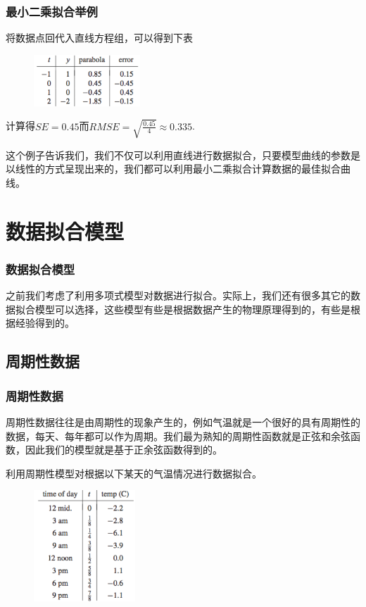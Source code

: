 \documentclass[10pt]{beamer}
\begin{document}
\begin{frame}
\frametitle{最小二乘拟合举例}
将数据点回代入直线方程组，可以得到下表
\begin{figure}
\includegraphics[width=4cm]{figs/4-1-2_Fitting_Data-5} 
\end{figure}
计算得$SE = 0.45$而$RMSE = \sqrt{\frac{0.45}{4}} \approx 0.335$.

\vspace{0.2cm}

这个例子告诉我们，我们不仅可以利用直线进行数据拟合，只要模型曲线的参数是以线性的方式呈现出来的，我们都可以利用最小二乘拟合计算数据的最佳拟合曲线。
\end{frame}





\section{数据拟合模型}


\begin{frame}
\frametitle{数据拟合模型}
之前我们考虑了利用多项式模型对数据进行拟合。实际上，我们还有很多其它的数据拟合模型可以选择，这些模型有些是根据数据产生的物理原理得到的，有些是根据经验得到的。
\end{frame}


\subsection{周期性数据}

\begin{frame}
\frametitle{周期性数据}
周期性数据往往是由周期性的现象产生的，例如气温就是一个很好的具有周期性的数据，每天、每年都可以作为周期。我们最为熟知的周期性函数就是正弦和余弦函数，因此我们的模型就是基于正余弦函数得到的。

\begin{example}
利用周期性模型对根据以下某天的气温情况进行数据拟合。
\begin{figure}
\includegraphics[width=3.8cm]{figs/4-2-1_Perriodic_Data-1} 
\end{figure}
\end{example}
\end{frame}
\end{document}
